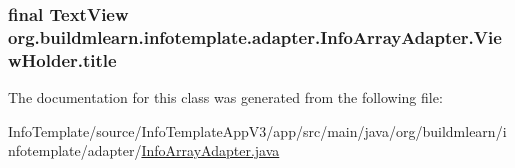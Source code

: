 \subsubsection[{\texorpdfstring{title}{title}}]{\setlength{\rightskip}{0pt plus 5cm}final Text\+View org.\+buildmlearn.\+infotemplate.\+adapter.\+Info\+Array\+Adapter.\+View\+Holder.\+title}\hypertarget{classorg_1_1buildmlearn_1_1infotemplate_1_1adapter_1_1InfoArrayAdapter_1_1ViewHolder_aaaca68d6acae1ec5aa22f3e531369ed4}{}\label{classorg_1_1buildmlearn_1_1infotemplate_1_1adapter_1_1InfoArrayAdapter_1_1ViewHolder_aaaca68d6acae1ec5aa22f3e531369ed4}


The documentation for this class was generated from the following file\+:\begin{DoxyCompactItemize}
\item 
Info\+Template/source/\+Info\+Template\+App\+V3/app/src/main/java/org/buildmlearn/infotemplate/adapter/\hyperlink{InfoArrayAdapter_8java}{Info\+Array\+Adapter.\+java}\end{DoxyCompactItemize}
